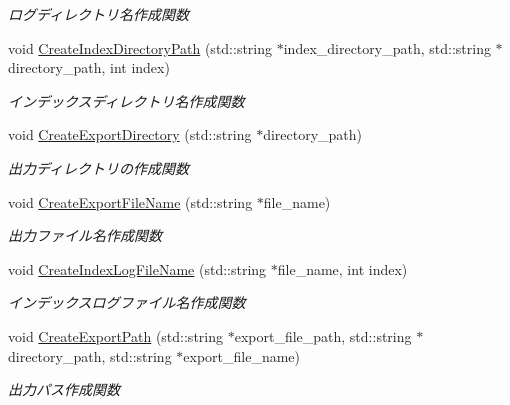 \begin{DoxyCompactItemize}
\begin{DoxyCompactList}\small\item\em ログディレクトリ名作成関数 \end{DoxyCompactList}\item 
void \mbox{\hyperlink{class_export_file_abf4344f171c496296579d9ad6d974afe}{Create\+Index\+Directory\+Path}} (std\+::string $\ast$index\+\_\+directory\+\_\+path, std\+::string $\ast$directory\+\_\+path, int index)
\begin{DoxyCompactList}\small\item\em インデックスディレクトリ名作成関数 \end{DoxyCompactList}\item 
void \mbox{\hyperlink{class_export_file_ad171b58b3ee1f84ed22a60afe55f4096}{Create\+Export\+Directory}} (std\+::string $\ast$directory\+\_\+path)
\begin{DoxyCompactList}\small\item\em 出力ディレクトリの作成関数 \end{DoxyCompactList}\item 
void \mbox{\hyperlink{class_export_file_a28a889812b0d24741f0466ff21ea4f82}{Create\+Export\+File\+Name}} (std\+::string $\ast$file\+\_\+name)
\begin{DoxyCompactList}\small\item\em 出力ファイル名作成関数 \end{DoxyCompactList}\item 
void \mbox{\hyperlink{class_export_file_a7c23d58ec17d273f55da9110745ef66b}{Create\+Index\+Log\+File\+Name}} (std\+::string $\ast$file\+\_\+name, int index)
\begin{DoxyCompactList}\small\item\em インデックスログファイル名作成関数 \end{DoxyCompactList}\item 
void \mbox{\hyperlink{class_export_file_afff4247767f7ad05091d60cba9279816}{Create\+Export\+Path}} (std\+::string $\ast$export\+\_\+file\+\_\+path, std\+::string $\ast$directory\+\_\+path, std\+::string $\ast$export\+\_\+file\+\_\+name)
\begin{DoxyCompactList}\small\item\em 出力パス作成関数 \end{DoxyCompactList}\end{DoxyCompactItemize}
